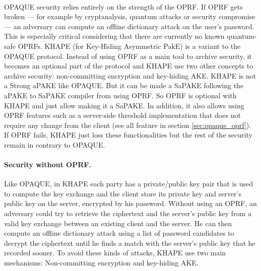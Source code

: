 ﻿\documentclass[../report.tex]{subfiles}
\begin{document}
\paragraph{}
OPAQUE security relies entirely on the strength of the OPRF. If OPRF gets broken --- for example by cryptanalysis, quantum attacks or security compromise --- an adversary can compute an offline dictionary attack on the user's password. This is especially critical considering that there are currently no known quantum-safe OPRFs.
KHAPE (for Key-Hiding Asymmetric PakE) \cite{KHAPE_Paper} is a variant to the OPAQUE protocol. Instead of using OPRF as a main tool to archive security, it becomes an optional part of the protocol and KHAPE use two other concepts to archive security: non-committing encryption and key-hiding AKE.
KHAPE is not a Strong aPAKE like OPAQUE. But it can be made a SaPAKE following the aPAKE to SaPAKE compiler from \cite{OPAQUE_Paper} using OPRF.
So OPRF is optional with KHAPE and just allow making it a SaPAKE. In addition, it also allows using OPRF features such as a server-side threshold implementation that does not require any change from the client (see all feature in section \ref{sec:opaque_oprf}). If OPRF fails, KHAPE just loss these functionalities but the rest of the security remain in contrary to OPAQUE.

\paragraph{Security without OPRF.}
Like OPAQUE, in KHAPE each party has a private/public key pair that is used to compute the key exchange and the client store its private key and server's public key on the server, encrypted by his password.
Without using an OPRF, an adversary could try to retrieve the ciphertext and the server's public key from a valid key exchange between an existing client and the server.
He can then compute an offline dictionary attack using a list of password candidates to decrypt the ciphertext until he finds a match with the server's public key that he recorded sooner.
To avoid these kinds of attacks, KHAPE use two main mechanisms: Non-committing encryption and key-hiding AKE.
\end{document}
